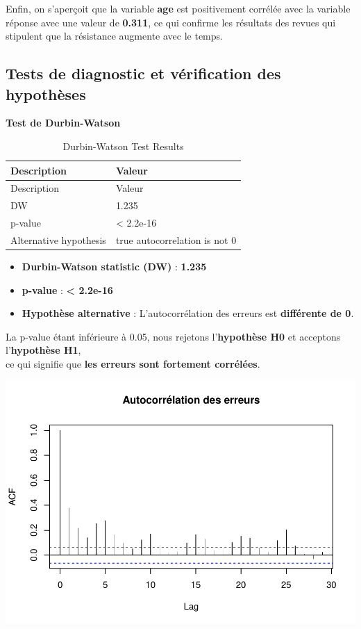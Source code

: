 \documentclass[
  12pt,
]{article}
\providecommand{\tightlist}{%
  \setlength{\itemsep}{0pt}\setlength{\parskip}{0pt}}
\begin{document}
Enfin, on s'aperçoit que la variable \textbf{age} est positivement
corrélée avec la variable réponse avec une valeur de \textbf{0.311}, ce
qui confirme les résultats des revues qui stipulent que la résistance
augmente avec le temps.

\subsection{Tests de diagnostic et vérification des
hypothèses}\label{tests-de-diagnostic-et-vuxe9rification-des-hypothuxe8ses}

\textbf{Test de Durbin-Watson}

\begin{longtable}[]{@{}ll@{}}
\caption{Durbin-Watson Test Results}\tabularnewline
\toprule\noalign{}
Description & Valeur \\
\midrule\noalign{}
\endfirsthead
\toprule\noalign{}
Description & Valeur \\
\midrule\noalign{}
\endhead
\bottomrule\noalign{}
\endlastfoot
DW & 1.235 \\
p-value & \textless{} 2.2e-16 \\
Alternative hypothesis & true autocorrelation is not 0 \\
\end{longtable}

\begin{itemize}
\tightlist
\item
  \textbf{Durbin-Watson statistic (DW)} : \textbf{1.235}\\
\item
  \textbf{p-value} : \textbf{\textless{} 2.2e-16}\\
\item
  \textbf{Hypothèse alternative} : L'autocorrélation des erreurs est
  \textbf{différente de 0}.
\end{itemize}

La p-value étant inférieure à 0.05, nous rejetons l'\textbf{hypothèse
H0} et acceptons l'\textbf{hypothèse H1},\\
ce qui signifie que \textbf{les erreurs sont fortement corrélées}.

\includegraphics{rmd_final_files/figure-latex/unnamed-chunk-14-1.pdf}
\end{document}
